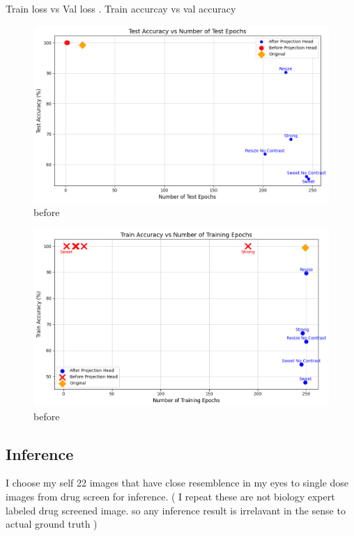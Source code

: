 Train loss vs Val loss . Train accurcay  vs val accuracy 
          



          \begin{figure}[H]
            \centering
            \includegraphics[scale=0.5]{figures/test_class.png} 
            \caption{before}
            \label{fig:before}
          \end{figure}

          \begin{figure}[H]
            \centering
            \includegraphics[scale=0.5]{figures/train_class.png} 
            \caption{before}
            \label{fig:before}
          \end{figure}
\subsection{Inference}

I choose my self 22 images that have close resemblence in my eyes to single dose images from drug screen for inference. ( I repeat these are not biology expert labeled drug 
screened image. so any inference result is irrelavant in the sense to actual ground truth )


